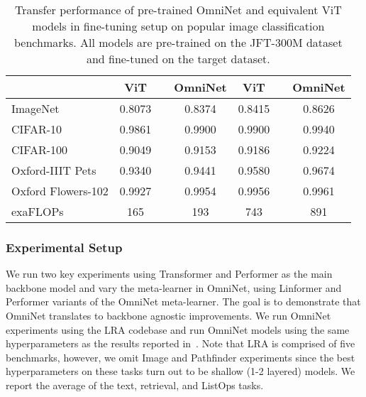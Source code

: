\documentclass{article}
\begin{document}
\begin{table*}
\vspace{-10pt}
\centering
\caption{Transfer performance of pre-trained OmniNet and equivalent ViT models in fine-tuning setup on popular image classification benchmarks. All models are pre-trained on the JFT-300M dataset and fine-tuned on the target dataset.}
\begin{tabular}{l c @{}p{0.2cm}@{} c | c @{}p{0.2cm}@{} c}
\toprule
   & ViT &  & OmniNet & ViT &  & OmniNet \\ 
\midrule 
ImageNet &  0.8073 & 	  & 0.8374 &  
            0.8415 & 	  & 0.8626 \\
CIFAR-10 &  0.9861 & 	  & 0.9900 &  
            0.9900 & 	  & 0.9940   \\
CIFAR-100 &  0.9049 & 	  & 0.9153 &  
            0.9186 & 	  & 0.9224  \\
Oxford-IIIT Pets &  0.9340 & 	  &0.9441  &  
                    0.9580 & 	  &0.9674  \\
Oxford Flowers-102 & 0.9927 & 	  &0.9954 & 
                     0.9956  & 	  &0.9961 \\
\midrule 
exaFLOPs  & 165 && 193 &  743 && 891 \\
\bottomrule
\end{tabular}
\label{tbl:OmniNet-ViT-fineting}
\end{table*}

\subsubsection{Experimental Setup}
We run two key experiments using Transformer and Performer as the main backbone model and vary the meta-learner in OmniNet, using Linformer and Performer variants of the OmniNet meta-learner. The goal is to demonstrate that OmniNet translates to backbone agnostic improvements. We run OmniNet experiments using the LRA codebase and run OmniNet models using the same hyperparameters as the results reported in~\citep{tay2020long}. Note that LRA is comprised of five benchmarks, however, we omit Image and Pathfinder experiments since the best hyperparameters on these tasks turn out to be shallow (1-2 layered) models. We report the average of the text, retrieval, and ListOps tasks. 
\end{document}

